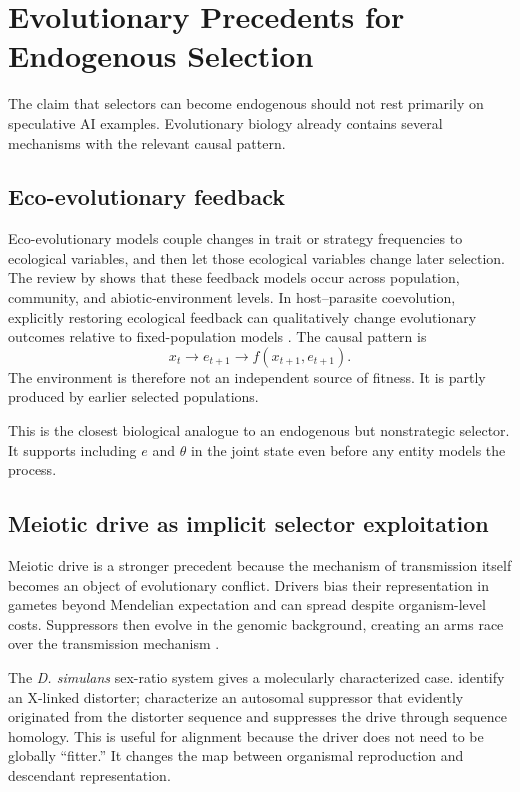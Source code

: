 \documentclass[11pt]{article}
\begin{document}
\section{Evolutionary Precedents for Endogenous Selection}

The claim that selectors can become endogenous should not rest primarily on speculative AI examples. Evolutionary biology already contains several mechanisms with the relevant causal pattern.

\subsection{Eco-evolutionary feedback}

Eco-evolutionary models couple changes in trait or strategy frequencies to ecological variables, and then let those ecological variables change later selection. The review by \textcite{govaert2019} shows that these feedback models occur across population, community, and abiotic-environment levels. In host--parasite coevolution, explicitly restoring ecological feedback can qualitatively change evolutionary outcomes relative to fixed-population models \parencite{ashby2019}. The causal pattern is
\begin{equation}
    x_t\rightarrow e_{t+1}\rightarrow f(x_{t+1},e_{t+1}).
\end{equation}
The environment is therefore not an independent source of fitness. It is partly produced by earlier selected populations.

This is the closest biological analogue to an endogenous but nonstrategic selector. It supports including $e$ and $\theta$ in the joint state even before any entity models the process.

\subsection{Meiotic drive as implicit selector exploitation}

Meiotic drive is a stronger precedent because the mechanism of transmission itself becomes an object of evolutionary conflict. Drivers bias their representation in gametes beyond Mendelian expectation and can spread despite organism-level costs. Suppressors then evolve in the genomic background, creating an arms race over the transmission mechanism \parencite{courret2019}.

The \emph{D. simulans} sex-ratio system gives a molecularly characterized case. \textcite{tao2007b} identify an X-linked distorter; \textcite{tao2007a} characterize an autosomal suppressor that evidently originated from the distorter sequence and suppresses the drive through sequence homology. This is useful for alignment because the driver does not need to be globally ``fitter.'' It changes the map between organismal reproduction and descendant representation.
\end{document}

